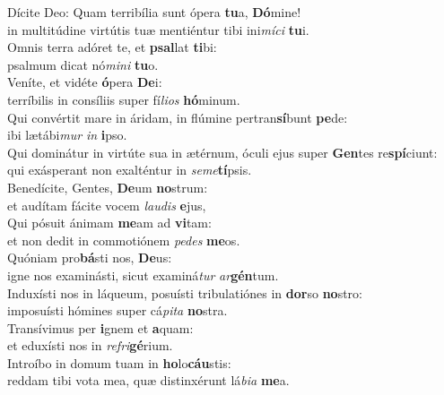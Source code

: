 \evenverse Dícite Deo: Quam terribília sunt ópera \textbf{tu}a, \textbf{Dó}mine!~\*\\
\evenverse in multitúdine virtútis tuæ mentiéntur tibi ini\textit{mí}\textit{ci} \textbf{tu}i.\\
\oddverse Omnis terra adóret te, et \textbf{psal}lat \textbf{ti}bi:~\*\\
\oddverse psalmum dicat nó\textit{mi}\textit{ni} \textbf{tu}o.\\
\evenverse Veníte, et vidéte \textbf{ó}pera \textbf{De}i:~\*\\
\evenverse terríbilis in consíliis super fí\textit{li}\textit{os} \textbf{hó}minum.\\
\oddverse Qui convértit mare in áridam, in flúmine pertran\textbf{sí}bunt \textbf{pe}de:~\*\\
\oddverse ibi lætábi\textit{mur} \textit{in} \textbf{i}pso.\\
\evenverse Qui dominátur in virtúte sua in ætérnum, óculi ejus super \textbf{Gen}tes re\textbf{spí}ciunt:~\*\\
\evenverse qui exásperant non exalténtur in \textit{se}\textit{me}\textbf{tí}psis.\\
\oddverse Benedícite, Gentes, \textbf{De}um \textbf{no}strum:~\*\\
\oddverse et audítam fácite vocem \textit{lau}\textit{dis} \textbf{e}jus,\\
\evenverse Qui pósuit ánimam \textbf{me}am ad \textbf{vi}tam:~\*\\
\evenverse et non dedit in commotiónem \textit{pe}\textit{des} \textbf{me}os.\\
\oddverse Quóniam pro\textbf{bá}sti nos, \textbf{De}us:~\*\\
\oddverse igne nos examinásti, sicut examiná\textit{tur} \textit{ar}\textbf{gén}tum.\\
\evenverse Induxísti nos in láqueum, posuísti tribulatiónes in \textbf{dor}so \textbf{no}stro:~\*\\
\evenverse imposuísti hómines super cá\textit{pi}\textit{ta} \textbf{no}stra.\\
\oddverse Transívimus per \textbf{i}gnem et \textbf{a}quam:~\*\\
\oddverse et eduxísti nos in \textit{re}\textit{fri}\textbf{gé}rium.\\
\evenverse Introíbo in domum tuam in \textbf{ho}lo\textbf{cáu}stis:~\*\\
\evenverse reddam tibi vota mea, quæ distinxérunt lá\textit{bi}\textit{a} \textbf{me}a.\\
